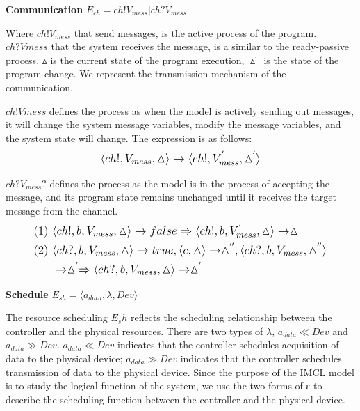 \begin{definition} \textbf{Communication} $E_{ch} = ch!V_{mess} |ch?V_{mess}$
\end{definition}
Where $ch!V_{mess}$ that send messages, is the active process of the program. $ch?Vmess$ that the system receives the message, is a similar to the ready-passive process. $\vartriangle$  is the current state of the program execution, $\vartriangle^{'}$ is the state of the program change. We represent the transmission mechanism of the communication.

$ch!Vmess$ defines the process as when the model is actively sending out messages, it will change the system message variables, modify the message variables, and the system state will change. The expression is as follows:
\begin{equation*}
    \normalsize
    \begin{aligned}
        \langle ch!, V_{mess}, \vartriangle \rangle \rightarrow \langle ch!, V_{mess}^{'}, \vartriangle^{'} \rangle
    \end{aligned}
\end{equation*}

$ch?V_{mess}?$ defines the process as the model is in the process of accepting the message, and its program state remains unchanged until it receives the target message from the channel.
\begin{equation*}
    \normalsize
    \begin{aligned}
        (1) \ & \langle ch!, b, V_{mess}, \vartriangle \rangle \rightarrow false \Rightarrow \langle ch!, b, V_{mess}^{'}, \vartriangle \rangle \rightarrow \vartriangle \\
        (2) \ & \langle ch?, b, V_{mess}, \vartriangle \rangle \rightarrow true, \langle c, \vartriangle \rangle \rightarrow \vartriangle^{''}, \langle ch?, b, V_{mess}, \vartriangle^{''} \rangle \\
         & \rightarrow \vartriangle^{'} \Rightarrow \langle ch?, b, V_{mess}, \vartriangle\rangle \rightarrow \vartriangle^{'}
    \end{aligned}
\end{equation*}

\begin{definition} \textbf{Schedule} $E_{sh} = \langle a_{data}, \lambda, Dev \rangle$
\end{definition}

The resource scheduling $E_sh$ reflects the scheduling relationship between the controller and the physical resources. There are two types of $\lambda$, $a_{data} \ll Dev$ and $a_{data} \gg Dev$. $a_{data} \ll Dev$ indicates that the controller schedules acquisition of data to the physical device; $a_{data} \gg Dev$ indicates that the controller schedules transmission of data to the physical device. Since the purpose of the IMCL model is to study the logical function of the system, we use the two forms of ε to describe the scheduling function between the controller and the physical device.

